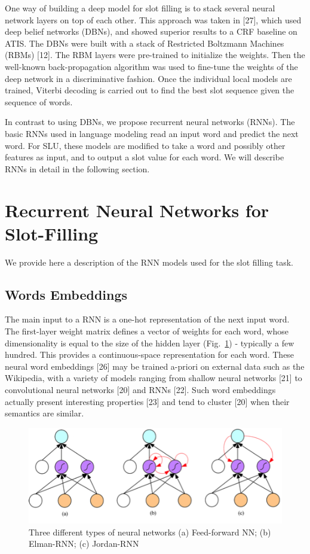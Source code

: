 One way of building a deep model for slot filling is to stack several neural
network layers on top of each other. This approach was taken in [27], which
used deep belief networks (DBNs), and showed superior results to a CRF baseline
on ATIS. The DBNs were built with a stack of Restricted Boltzmann Machines
(RBMs) [12]. The RBM layers were pre-trained to initialize the weights. Then
the well-known back-propagation algorithm was used to fine-tune the weights of
the deep network in a discriminative fashion. Once the individual local models
are trained, Viterbi decoding is carried out to find the best slot sequence
given the sequence of words. 

In contrast to using DBNs, we propose recurrent neural networks (RNNs). The
basic RNNs used in language modeling read an input word and predict the next
word. For SLU, these models are modified to take a word and possibly other
features as input, and to output a slot value for each word. We will describe
RNNs in detail in the following section. 

\section{Recurrent Neural Networks for Slot-Filling}
\label{sec:rnnsf}

We provide here a description of the RNN models used for the slot filling task. 

\subsection{Words Embeddings}

The main input to a RNN is a one-hot representation of the next input word. The
first-layer weight matrix defines a vector of weights for each word, whose
dimensionality is equal to the size of the hidden layer (Fig.~\ref{fig:rnn}) - typically a
few hundred. This provides a continuous-space representation for each word.
These neural word embeddings [26] may be trained a-priori on external data such
as the Wikipedia, with a variety of models ranging from shallow neural networks
[21] to convolutional neural networks [20] and RNNs [22]. Such word embeddings
actually present interesting properties [23] and tend to cluster [20] when
their semantics are similar.

\begin{figure}[t]
\begin{center}
\includegraphics[width=.8\linewidth]{article4/images/rnn.png}
\caption{\label{fig:rnn} Three different types of neural networks 
(a) Feed-forward NN; (b) Elman-RNN; (c) Jordan-RNN}
\vspace{-0.2in}
\end{center}
\vspace*{-1mm}
\end{figure}


